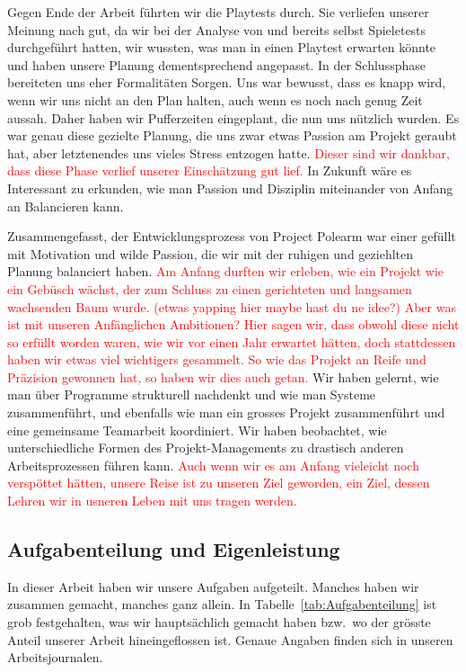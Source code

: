 \documentclass[../Main.tex]{subfiles}
\begin{document}
Gegen Ende der Arbeit führten wir die Playtests durch. Sie verliefen unserer Meinung nach gut, da wir bei der Analyse von  und  bereits selbst Spieletests durchgeführt hatten, wir wussten, was man in einen Playtest erwarten könnte und haben unsere Planung dementsprechend angepasst. In der Schlussphase bereiteten uns eher Formalitäten Sorgen. Uns war bewusst, dass es knapp wird, wenn wir uns nicht an den Plan halten, auch wenn es noch nach genug Zeit aussah. Daher haben wir Pufferzeiten eingeplant, die nun uns nützlich wurden. Es war genau diese gezielte Planung, die uns zwar etwas Passion am Projekt geraubt hat, aber letztenendes uns vieles Stress entzogen hatte. \textcolor{red}{Dieser sind wir dankbar, dass diese Phase verlief unserer Einschätzung gut lief.} In Zukunft wäre es Interessant zu erkunden, wie man Passion und Disziplin miteinander von Anfang an Balancieren kann.

Zusammengefasst, der Entwicklungsprozess von Project Polearm war einer gefüllt mit Motivation und wilde Passion, die wir mit der ruhigen und geziehlten Planung balanciert haben. \textcolor{red}{Am Anfang durften wir erleben, wie ein Projekt wie ein Gebüsch wächst, der zum Schluss zu einen gerichteten und langsamen wachsenden Baum wurde. (etwas yapping hier maybe hast du ne idee?) Aber was ist mit unseren Anfänglichen Ambitionen? Hier sagen wir, dass obwohl diese nicht so erfüllt worden waren, wie wir vor einen Jahr erwartet hätten, doch stattdessen haben wir etwas viel wichtigers gesammelt. So wie das Projekt an Reife und Präzision gewonnen hat, so haben wir dies auch getan.} Wir haben gelernt, wie man über Programme strukturell nachdenkt und wie man Systeme zusammenführt, und ebenfalls wie man ein grosses Projekt zusammenführt und eine gemeinsame Teamarbeit koordiniert. Wir haben beobachtet, wie unterschiedliche Formen des Projekt-Managements zu drastisch anderen Arbeitsprozessen führen kann. \textcolor{red}{Auch wenn wir es am Anfang vieleicht noch verspöttet hätten, unsere Reise ist zu unseren Ziel geworden, ein Ziel, dessen Lehren wir in usneren Leben mit uns tragen werden.}

\subsection{Aufgabenteilung und Eigenleistung} \label{sec:Aufgabenteilung}

In dieser Arbeit haben wir unsere Aufgaben aufgeteilt. Manches haben wir zusammen gemacht, manches ganz allein. In Tabelle~\ref{tab:Aufgabenteilung} ist grob festgehalten, was wir hauptsächlich gemacht haben bzw.\ wo der grösste Anteil unserer Arbeit hineingeflossen ist. Genaue Angaben finden sich in unseren Arbeitsjournalen.
\end{document}

